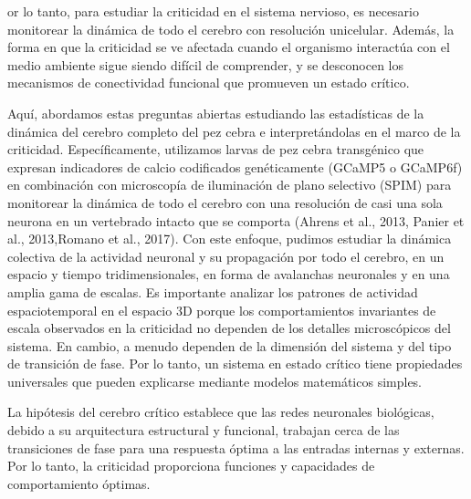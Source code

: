 or lo tanto, para estudiar la criticidad en el sistema nervioso, es necesario monitorear la dinámica de todo el cerebro con resolución unicelular. Además, la forma en que la criticidad se ve afectada cuando el organismo interactúa con el medio ambiente sigue siendo difícil de comprender, y se desconocen los mecanismos de conectividad funcional que promueven un estado crítico.

Aquí, abordamos estas preguntas abiertas estudiando las estadísticas de la dinámica del cerebro completo del pez cebra e interpretándolas en el marco de la criticidad. Específicamente, utilizamos larvas de pez cebra transgénico que expresan indicadores de calcio codificados genéticamente (GCaMP5 o GCaMP6f) en combinación con microscopía de iluminación de plano selectivo (SPIM) para monitorear la dinámica de todo el cerebro con una resolución de casi una sola neurona en un vertebrado intacto que se comporta (Ahrens et al., 2013, Panier et al., 2013,Romano et al., 2017). Con este enfoque, pudimos estudiar la dinámica colectiva de la actividad neuronal y su propagación por todo el cerebro, en un espacio y tiempo tridimensionales, en forma de avalanchas neuronales y en una amplia gama de escalas. Es importante analizar los patrones de actividad espaciotemporal en el espacio 3D porque los comportamientos invariantes de escala observados en la criticidad no dependen de los detalles microscópicos del sistema. En cambio, a menudo dependen de la dimensión del sistema y del tipo de transición de fase. Por lo tanto, un sistema en estado crítico tiene propiedades universales que pueden explicarse mediante modelos matemáticos simples. %

La hipótesis del cerebro crítico establece que las redes neuronales biológicas, debido a su arquitectura estructural y funcional, trabajan cerca de las transiciones de fase para una respuesta óptima a las entradas internas y externas. Por lo tanto, la criticidad proporciona funciones y capacidades de comportamiento óptimas.


